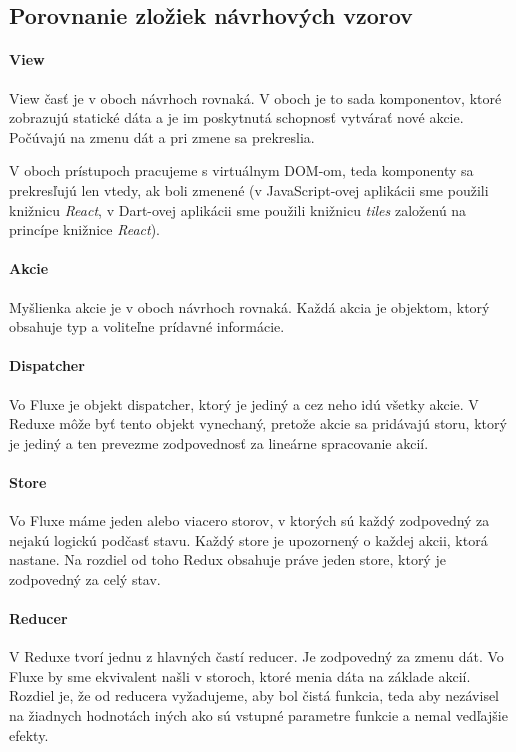 \subsection{Porovnanie zložiek návrhových vzorov}%

\paragraph{View}%
View časť je v oboch návrhoch rovnaká. V oboch je to sada komponentov, ktoré zobrazujú statické dáta a je im poskytnutá schopnosť vytvárať nové akcie. Počúvajú na zmenu dát a pri zmene sa prekreslia.

\NEW{}
V oboch prístupoch pracujeme s virtuálnym DOM-om, teda komponenty sa prekresľujú len vtedy, ak boli zmenené (v JavaScript-ovej aplikácii sme použili knižnicu \emph{React}, v Dart-ovej aplikácii sme použili knižnicu \emph{tiles} založenú na princípe knižnice \emph{React}).

\paragraph{Akcie}
Myšlienka akcie je v oboch návrhoch rovnaká. Každá akcia je objektom, ktorý obsahuje typ a voliteľne prídavné informácie.

\paragraph{Dispatcher}
Vo Fluxe je objekt dispatcher, ktorý je jediný a cez neho idú všetky akcie. V Reduxe môže byť tento objekt vynechaný, pretože akcie sa pridávajú storu, ktorý je jediný a ten prevezme zodpovednosť za lineárne spracovanie akcií.

\paragraph{Store}
Vo Fluxe máme jeden alebo viacero storov, v ktorých sú každý zodpovedný za nejakú logickú podčasť stavu. Každý store je upozornený o každej akcii, ktorá nastane. Na rozdiel od toho Redux obsahuje práve jeden store, ktorý je zodpovedný za celý stav.

\paragraph{Reducer}%
V Reduxe tvorí jednu z hlavných častí reducer. Je zodpovedný za zmenu dát. Vo Fluxe by sme ekvivalent našli v storoch, ktoré menia dáta na základe akcií. Rozdiel je, že od reducera vyžadujeme, aby bol čistá funkcia, teda aby nezávisel na žiadnych hodnotách iných ako sú vstupné parametre funkcie a nemal vedľajšie efekty. 

